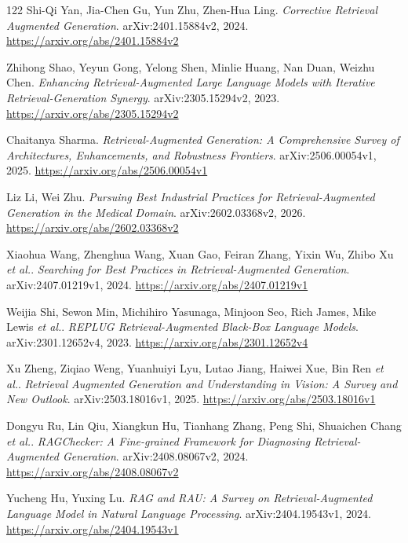 \documentclass[11pt,a4paper]{article}
\begin{document}
\begin{thebibliography}{122}
Shi-Qi Yan, Jia-Chen Gu, Yun Zhu, Zhen-Hua Ling.
\newblock \emph{Corrective Retrieval Augmented Generation}.
\newblock arXiv:2401.15884v2, 2024.
\newblock \url{https://arxiv.org/abs/2401.15884v2}

Zhihong Shao, Yeyun Gong, Yelong Shen, Minlie Huang, Nan Duan, Weizhu Chen.
\newblock \emph{Enhancing Retrieval-Augmented Large Language Models with Iterative Retrieval-Generation Synergy}.
\newblock arXiv:2305.15294v2, 2023.
\newblock \url{https://arxiv.org/abs/2305.15294v2}

Chaitanya Sharma.
\newblock \emph{Retrieval-Augmented Generation: A Comprehensive Survey of Architectures, Enhancements, and Robustness Frontiers}.
\newblock arXiv:2506.00054v1, 2025.
\newblock \url{https://arxiv.org/abs/2506.00054v1}

Liz Li, Wei Zhu.
\newblock \emph{Pursuing Best Industrial Practices for Retrieval-Augmented Generation in the Medical Domain}.
\newblock arXiv:2602.03368v2, 2026.
\newblock \url{https://arxiv.org/abs/2602.03368v2}

Xiaohua Wang, Zhenghua Wang, Xuan Gao, Feiran Zhang, Yixin Wu, Zhibo Xu \emph{et al.}.
\newblock \emph{Searching for Best Practices in Retrieval-Augmented Generation}.
\newblock arXiv:2407.01219v1, 2024.
\newblock \url{https://arxiv.org/abs/2407.01219v1}

Weijia Shi, Sewon Min, Michihiro Yasunaga, Minjoon Seo, Rich James, Mike Lewis \emph{et al.}.
\newblock \emph{REPLUG Retrieval-Augmented Black-Box Language Models}.
\newblock arXiv:2301.12652v4, 2023.
\newblock \url{https://arxiv.org/abs/2301.12652v4}

Xu Zheng, Ziqiao Weng, Yuanhuiyi Lyu, Lutao Jiang, Haiwei Xue, Bin Ren \emph{et al.}.
\newblock \emph{Retrieval Augmented Generation and Understanding in Vision: A Survey and New Outlook}.
\newblock arXiv:2503.18016v1, 2025.
\newblock \url{https://arxiv.org/abs/2503.18016v1}

Dongyu Ru, Lin Qiu, Xiangkun Hu, Tianhang Zhang, Peng Shi, Shuaichen Chang \emph{et al.}.
\newblock \emph{RAGChecker: A Fine-grained Framework for Diagnosing Retrieval-Augmented Generation}.
\newblock arXiv:2408.08067v2, 2024.
\newblock \url{https://arxiv.org/abs/2408.08067v2}

Yucheng Hu, Yuxing Lu.
\newblock \emph{RAG and RAU: A Survey on Retrieval-Augmented Language Model in Natural Language Processing}.
\newblock arXiv:2404.19543v1, 2024.
\newblock \url{https://arxiv.org/abs/2404.19543v1}


\end{thebibliography}
\end{document}
